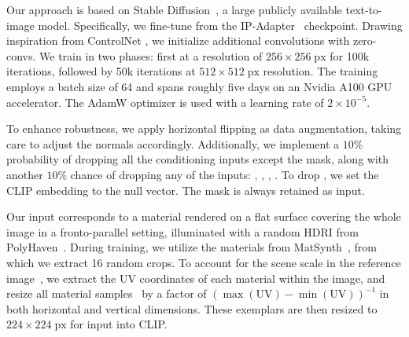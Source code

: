 Our approach is based on Stable Diffusion~\cite{rombach2021highresolution}, a large publicly available text-to-image model. Specifically, we fine-tune from the IP-Adapter~\cite{ye2023ipadapter} checkpoint. Drawing inspiration from ControlNet \cite{zhang2023controlnet}, we initialize additional convolutions with zero-convs.
We train in two phases: first at a resolution of $256\!\times{}\!256\;\mathrm{px}$ for 100k iterations, followed by 50k iterations at $512\!\times{}\!512\;\mathrm{px}$ resolution. The training employs a batch size of 64 and spans roughly five days on an Nvidia A100 GPU accelerator. The AdamW optimizer \cite{kingma2014adam,loshchilov2017fixing} is used with a learning rate of $2\!\times{}\!10^{-5}$.

To enhance robustness, we apply horizontal flipping as data augmentation, taking care to adjust the normals accordingly. Additionally, we implement a $10\%$ probability of dropping all the conditioning inputs except the mask, along with another $10\%$ chance of dropping any of the inputs: \irra, \normal, \target, \exemplar. To drop \exemplar{}, we set the CLIP embedding to the null vector. The mask \mask is always retained as input. 

Our input \exemplar corresponds to a material rendered on a flat surface covering the whole image in a fronto-parallel setting, illuminated with a random HDRI from PolyHaven~\cite{polyhaven}. During training, we utilize the materials from MatSynth~\cite{vecchio2023matsynth}, from which we extract 16 random crops. To account for the scene scale in the reference image~\target{}, we extract the UV coordinates of each material within the image, and resize all material samples~\exemplar{} by a factor of $\left( \max{\left( \mathrm{UV} \right)} - \min{\left( \mathrm{UV} \right)}\right)^{-1}$ in both horizontal and vertical dimensions. 
These exemplars are then resized to $224\!\times{}\!224\;\mathrm{px}$ for input into CLIP. 

